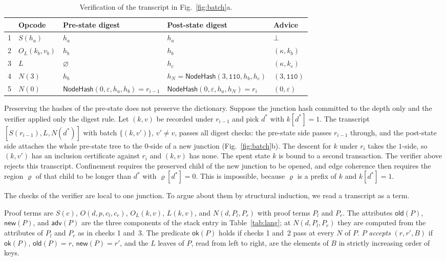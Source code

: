 \documentclass[runningheads]{llncs}
\newcommand{\NodeHash}{\mathsf{NodeHash}}
\newcommand{\Old}{\mathsf{old}}
\newcommand{\New}{\mathsf{new}}
\newcommand{\Adv}{\mathsf{adv}}
\newcommand{\Ok}{\mathsf{ok}}
\newcommand{\bits}[1]{\texttt{#1}}
\begin{document}
\begin{table}[t]
\centering
\caption{Verification of the transcript in Fig.~\ref{fig:batch}a.}\label{tab:trace}
\footnotesize
\setlength{\tabcolsep}{4pt}
\begin{tabular}{@{}lllll@{}}
\toprule
& Opcode & Pre-state digest & Post-state digest & Advice \\
\midrule
1 & $S(h_a)$ & $h_a$ & $h_a$ & $\bot$ \\
2 & $O_L(k_b,v_b)$ & $h_b$ & $h_b$ & $(\kappa, k_b)$ \\
3 & $L$ & $\varnothing$ & $h_c$ & $(\kappa, k_c)$ \\
4 & $N(3)$ & $h_b$ & $h_N = \NodeHash(3,\bits{110},h_b,h_c)$ & $(3,\bits{110})$ \\
5 & $N(0)$ & $\NodeHash(0,\varepsilon,h_a,h_b) = r_{i-1}$ & $\NodeHash(0,\varepsilon,h_a,h_N) = r_i$ & $(0,\varepsilon)$ \\
\bottomrule
\end{tabular}
\end{table}

\begin{remark}[Placement]\label{rem:placement}
Preserving the hashes of the pre-state does not preserve the dictionary. Suppose the junction hash committed to the depth only and the verifier applied only the digest rule. Let $(k,v)$ be recorded under $r_{i-1}$ and pick $d^*$ with $k[d^*] = 1$. The transcript $[S(r_{i-1}), L, N(d^*)]$ with batch $\{(k,v')\}$, $v' \neq v$, passes all digest checks: the pre-state side passes $r_{i-1}$ through, and the post-state side attaches the whole pre-state tree to the $0$-side of a new junction (Fig.~\ref{fig:batch}b). The descent for $k$ under $r_i$ takes the $1$-side, so $(k,v')$ has an inclusion certificate against $r_i$ and $(k,v)$ has none. The spent state $k$ is bound to a second transaction. The verifier above rejects this transcript. Confinement requires the preserved child of the new junction to be opened, and edge coherence then requires the region $\varrho$ of that child to be longer than $d^*$ with $\varrho[d^*] = 0$. This is impossible, because $\varrho$ is a prefix of $k$ and $k[d^*] = 1$.
\end{remark}

The checks of the verifier are local to one junction. To argue about them by structural induction, we read a transcript as a term.

\begin{definition}\label{def:pterm}
Proof terms are $S(c)$, $O(d,p,c_l,c_r)$, $O_L(k,v)$, $L(k,v)$, and $N(d,P_l,P_r)$ with proof terms $P_l$ and $P_r$. The attributes $\Old(P)$, $\New(P)$, and $\Adv(P)$ are the three components of the stack entry in Table~\ref{tab:lang}; at $N(d,P_l,P_r)$ they are computed from the attributes of $P_l$ and $P_r$ as in checks 1 and~3. The predicate $\Ok(P)$ holds if checks 1 and~2 pass at every $N$ of $P$. $P$ \emph{accepts} $(r,r',B)$ if $\Ok(P)$, $\Old(P) = r$, $\New(P) = r'$, and the $L$ leaves of $P$, read from left to right, are the elements of $B$ in strictly increasing order of keys.
\end{definition}
\end{document}
